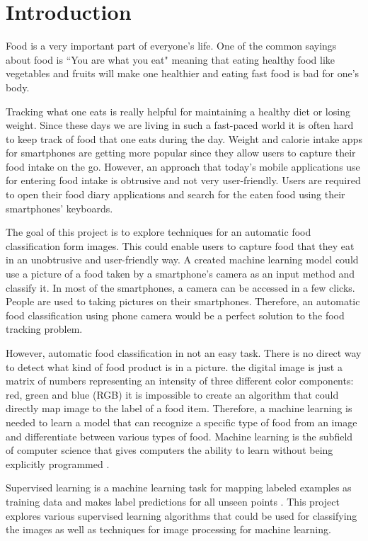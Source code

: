\chapter{Introduction}

Food is a very important part of everyone’s life.  One of the common sayings about food is ``You are what you eat" meaning that eating healthy food like vegetables and fruits will make one healthier and eating fast food is bad for one’s body.  

Tracking what one eats is really helpful for maintaining a healthy diet or losing weight. Since these days we are living in such a fast-paced world it is often hard to keep track of food that one eats during the day. Weight and calorie intake apps for smartphones are getting more popular since they allow users to capture their food intake on the go. However, an approach that today’s mobile applications use for entering food intake is obtrusive and not very user-friendly. Users are required to open their food diary applications and search for the eaten food using their smartphones' keyboards. 

The goal of this project is to explore techniques for an automatic food classification form images. This could enable users to capture food that they eat in an unobtrusive and user-friendly way. A created machine learning model could use a picture of a food taken by a smartphone's camera as an input method and classify it. In most of the smartphones, a camera can be accessed in a few clicks. People are used to taking pictures on their smartphones. Therefore, an automatic food classification using phone camera would be a perfect solution to the food tracking problem. 

However, automatic food classification in not an easy task. There is no direct way to detect what kind of food product is in a picture. the digital image is just a matrix of numbers representing an intensity of three different color components: red, green and blue (RGB) it is impossible to create an algorithm that could directly map image to the label of a food item. Therefore, a machine learning is needed to learn a model that can recognize a specific type of food from an image and differentiate between various types of food. Machine learning is the subfield of computer science that gives computers the ability to learn without being explicitly programmed \citep{Samuel}.

Supervised learning is a machine learning task for mapping labeled examples as training data and makes label predictions for all unseen points \citep{Mohri:2012:FML:2371238}. This project explores various supervised learning algorithms that could be used for classifying the images as well as techniques for image processing for machine learning.

